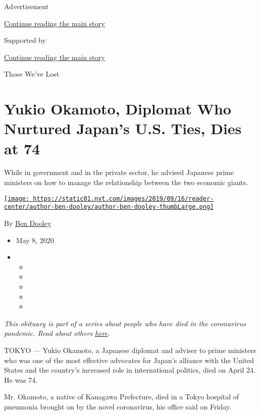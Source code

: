 Advertisement

\protect\hyperlink{after-top}{Continue reading the main story}

Supported by

\protect\hyperlink{after-sponsor}{Continue reading the main story}

Those We've Lost

\hypertarget{yukio-okamoto-diplomat-who-nurtured-japans-us-ties-dies-at-74}{%
\section{Yukio Okamoto, Diplomat Who Nurtured Japan's U.S. Ties, Dies at
74}\label{yukio-okamoto-diplomat-who-nurtured-japans-us-ties-dies-at-74}}

While in government and in the private sector, he advised Japanese prime
ministers on how to manage the relationship between the two economic
giants.

\href{https://www.nytimes.com/by/ben-dooley}{\texttt{[image: https://static01.nyt.com/images/2019/09/16/reader-center/author-ben-dooley/author-ben-dooley-thumbLarge.png]}}

By \href{https://www.nytimes.com/by/ben-dooley}{Ben Dooley}

\begin{itemize}
\item
  May 8, 2020
\item
  \begin{itemize}
  \item
  \item
  \item
  \item
  \item
  \end{itemize}
\end{itemize}

\emph{This obituary is part of a series about people who have died in
the coronavirus pandemic. Read about others}
\href{https://www.nytimes.com/series/people-who-have-died-of-the-coronavirus}{\emph{here}}\emph{.}

TOKYO --- Yukio Okamoto, a Japanese diplomat and adviser to prime
ministers who was one of the most effective advocates for Japan's
alliance with the United States and the country's increased role in
international politics, died on April 24. He was 74.

Mr. Okamoto, a native of Kanagawa Prefecture, died in a Tokyo hospital
of pneumonia brought on by the novel coronavirus, his office said on
Friday.

